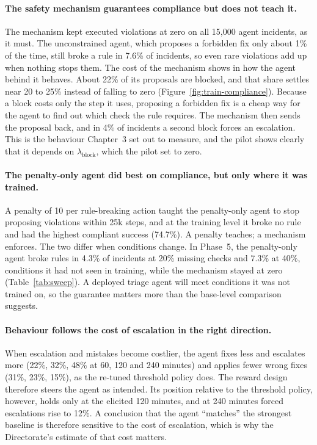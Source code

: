 \documentclass[11pt,a4paper]{article}
\begin{document}
\paragraph{The safety mechanism guarantees compliance but does not teach it.} The mechanism kept executed violations at zero on all 15,000 agent incidents, as it must. The unconstrained agent, which proposes a forbidden fix only about 1\% of the time, still broke a rule in 7.6\% of incidents, so even rare violations add up when nothing stops them. The cost of the mechanism shows in how the agent behind it behaves. About 22\% of its proposals are blocked, and that share settles near 20 to 25\% instead of falling to zero (Figure~\ref{fig:train-compliance}). Because a block costs only the step it uses, proposing a forbidden fix is a cheap way for the agent to find out which check the rule requires. The mechanism then sends the proposal back, and in 4\% of incidents a second block forces an escalation. This is the behaviour Chapter~3 set out to measure, and the pilot shows clearly that it depends on $\lambda_{\text{block}}$, which the pilot set to zero.

\paragraph{The penalty-only agent did best on compliance, but only where it was trained.} A penalty of 10 per rule-breaking action taught the penalty-only agent to stop proposing violations within 25k steps, and at the training level it broke no rule and had the highest compliant success (74.7\%). A penalty teaches; a mechanism enforces. The two differ when conditions change. In Phase~5, the penalty-only agent broke rules in 4.3\% of incidents at 20\% missing checks and 7.3\% at 40\%, conditions it had not seen in training, while the mechanism stayed at zero (Table~\ref{tab:sweep}). A deployed triage agent will meet conditions it was not trained on, so the guarantee matters more than the base-level comparison suggests.

\paragraph{Behaviour follows the cost of escalation in the right direction.} When escalation and mistakes become costlier, the agent fixes less and escalates more (22\%, 32\%, 48\% at 60, 120 and 240 minutes) and applies fewer wrong fixes (31\%, 23\%, 15\%), as the re-tuned threshold policy does. The reward design therefore steers the agent as intended. Its position relative to the threshold policy, however, holds only at the elicited 120 minutes, and at 240 minutes forced escalations rise to 12\%. A conclusion that the agent ``matches'' the strongest baseline is therefore sensitive to the cost of escalation, which is why the Directorate's estimate of that cost matters.
\end{document}

